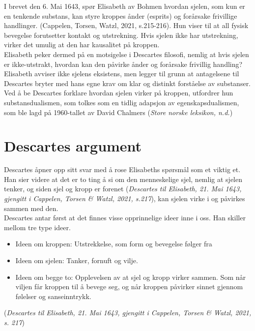 \documentclass[12pt, a4paper]{article}
\begin{document}
I brevet den 6. Mai 1643, spør Elisabeth av Bohmen hvordan sjelen, som kun er en tenkende substans, kan styre kroppes ånder (esprits) og forårsake frivillige handlinger. (Cappelen, Torsen, Watzl, 2021, s.215-216). Hun viser til at all fysisk bevegelse forutsetter kontakt og utstrekning. Hvis sjelen ikke har utstrekning, virker det umulig at den har kausalitet på kroppen. \\

Elisabeth peker dermed på en motsigelse i Descartes filosofi, nemlig at hvis sjelen er ikke-utstrakt, hvordan kan den påvirke ånder og forårsake frivillig handling? Elisabeth avviser ikke sjelens eksistens, men legger til grunn at antagelsene til Descartes bryter med hans egne krav om klar og distinkt forståelse av substanser. \\

Ved å be Descartes forklare hvordan sjelen virker på kroppen, utfordrer hun substansdualismen, som tolkes som en tidlig adapsjon av egenskapsdualismen, som ble lagd på 1960-tallet av David Chalmers (\textit{Store norske leksikon, n.d.})
\section{Descartes argument}

Descartes åpner opp sitt svar med å rose Elisabeths spørsmål som et viktig et. Han sier videre at det er to ting å si om den menneskelige sjel, nemlig at sjelen tenker, og siden sjel og kropp er forenet (\textit{Descartes til Elisabeth, 21. Mai 1643, gjengitt i Cappelen, Torsen \& Watzl, 2021, s.217}), kan sjelen virke i og påvirkes sammen med den. \\ 

Descartes antar først at det finnes visse opprinnelige ideer inne i oss. Han skiller mellom tre type ideer.

\begin{itemize}
    \item Ideen om kroppen: Utstrekkelse, som form og bevegelse følger fra
    \item Ideen om sjelen: Tanker, fornuft og vilje.
    \item Ideen om begge to: Opplevelsen av at sjel og kropp virker sammen. Som når viljen får kroppen til å bevege seg, og når kroppen påvirker sinnet gjennom følelser og sanseinntrykk.
\end{itemize}

(\textit{Descartes til Elisabeth, 21. Mai 1643, gjengitt i Cappelen, Torsen \& Watzl, 2021, s. 217})
\end{document}
